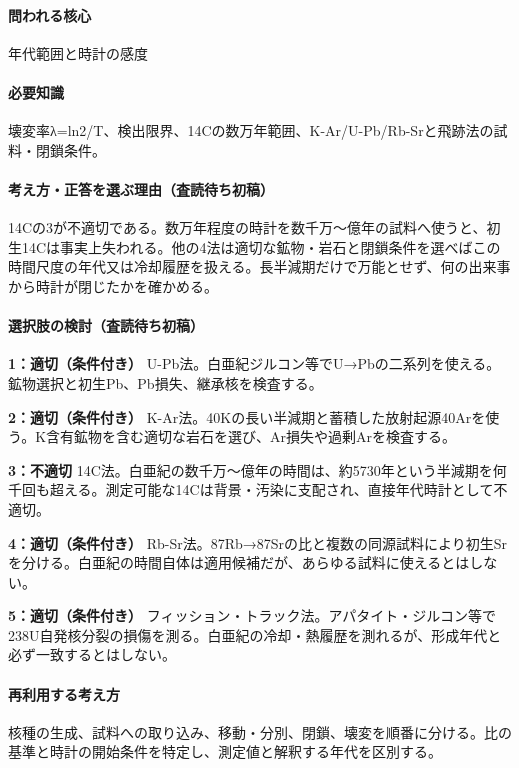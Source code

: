\paragraph{問われる核心} 年代範囲と時計の感度

\paragraph{必要知識} 壊変率λ=ln2/T、検出限界、14Cの数万年範囲、K-Ar/U-Pb/Rb-Srと飛跡法の試料・閉鎖条件。

\paragraph{考え方・正答を選ぶ理由（査読待ち初稿）} 14Cの3が不適切である。数万年程度の時計を数千万〜億年の試料へ使うと、初生14Cは事実上失われる。他の4法は適切な鉱物・岩石と閉鎖条件を選べばこの時間尺度の年代又は冷却履歴を扱える。長半減期だけで万能とせず、何の出来事から時計が閉じたかを確かめる。

\paragraph{選択肢の検討（査読待ち初稿）}\mbox{}\par

\noindent\textbf{1：適切（条件付き）} U-Pb法。白亜紀ジルコン等でU→Pbの二系列を使える。鉱物選択と初生Pb、Pb損失、継承核を検査する。\par

\noindent\textbf{2：適切（条件付き）} K-Ar法。40Kの長い半減期と蓄積した放射起源40Arを使う。K含有鉱物を含む適切な岩石を選び、Ar損失や過剰Arを検査する。\par

\noindent\textbf{3：不適切} 14C法。白亜紀の数千万〜億年の時間は、約5730年という半減期を何千回も超える。測定可能な14Cは背景・汚染に支配され、直接年代時計として不適切。\par

\noindent\textbf{4：適切（条件付き）} Rb-Sr法。87Rb→87Srの比と複数の同源試料により初生Srを分ける。白亜紀の時間自体は適用候補だが、あらゆる試料に使えるとはしない。\par

\noindent\textbf{5：適切（条件付き）} フィッション・トラック法。アパタイト・ジルコン等で238U自発核分裂の損傷を測る。白亜紀の冷却・熱履歴を測れるが、形成年代と必ず一致するとはしない。\par

\paragraph{再利用する考え方} 核種の生成、試料への取り込み、移動・分別、閉鎖、壊変を順番に分ける。比の基準と時計の開始条件を特定し、測定値と解釈する年代を区別する。

